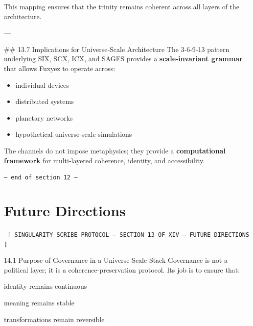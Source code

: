 \begin{enumerate}
This mapping ensures that the trinity remains coherent across all layers of the architecture.

---

\#\# 13.7 Implications for Universe‑Scale Architecture  
The 3‑6‑9‑13 pattern underlying SIX, SCX, ICX, and SAGES provides a \textbf{scale‑invariant grammar} that allows Fuxyez to operate across:

\begin{itemize}
  \item individual devices  
  \item distributed systems  
  \item planetary networks  
  \item hypothetical universe‑scale simulations  
\end{itemize}

The channels do not impose metaphysics; they provide a \textbf{computational framework} for multi‑layered coherence, identity, and accessibility.
    
    \vspace{1cm}
    \begin{center}
    \color{alienPurple}\texttt{--- end of section 12 ---}
    \end{center}
    \clearpage
    

    \chapter*{Future Directions}
    
    
    \begin{glyphbox}
    \centering
    \color{neonCyan}\fontsize{8}{10}\selectfont\texttt{
    [ SINGULARITY SCRIBE PROTOCOL -- SECTION 13 OF XIV -- FUTURE DIRECTIONS ]
    }
    \end{glyphbox}
    \vspace{0.3cm}
    
    
    14.1 Purpose of Governance in a Universe‑Scale Stack
Governance is not a political layer; it is a coherence‑preservation protocol.
Its job is to ensure that:

identity remains continuous

meaning remains stable

transformations remain reversible


\end{enumerate}
